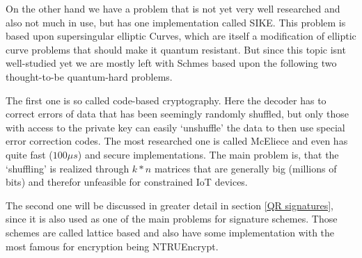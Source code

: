 \documentclass[conference]{IEEEtran}
\begin{document}
On the other hand we have a problem that is not yet very well researched and also not much in use, but has one implementation called SIKE. This problem is based upon supersingular elliptic Curves, which are itself a modification of elliptic curve problems that should make it quantum resistant. But since this topic isnt well-studied yet we are mostly left with Schmes based upon the following two thought-to-be quantum-hard problems.

The first one is so called code-based cryptography. Here the decoder has to correct errors of data that has been seemingly randomly shuffled, but only those with access to the private key can easily `unshuffle' the data to then use special error correction codes. 
The most researched one is called McEliece and even has quite fast ($100 \mu s$) and secure implementations. 
The main problem is, that the `shuffling' is realized through $k*n$ matrices that are generally big (millions of bits) and therefor unfeasible for constrained IoT devices.

The second one will be discussed in greater detail in section \ref{QR signatures}, since it is also used as one of the main problems for signature schemes.
Those schemes are called lattice based and also have some implementation with the most famous for encryption being NTRUEncrypt.
\end{document}
